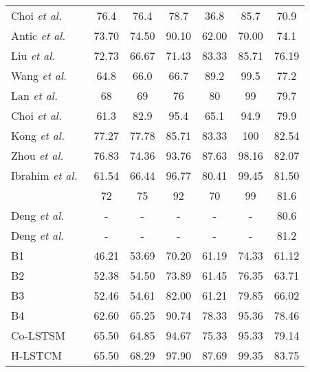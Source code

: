 \documentclass[9pt,journal,letterpaper,twocolumn]{IEEEtran}
\begin{document}
\begin{table}[!t]
{\begin{center}
\begin{tabular}{lc cc ccc}
					\hspace{-0.5em}Choi {\em et al.}~\cite{choi2011learning}& 76.4  & 76.4 & 78.7 & 36.8 & 85.7 & 70.9  \\
					\hspace{-0.5em}Antic {\em et al.}~\cite{antic2014learning} & 73.70 & 74.50 & 90.10 & 62.00 & 70.00 & 74.1 \\
					\hspace{-0.5em}Liu {\em et al.}~\cite{liu2011recognizing}& 72.73  & 66.67  & 71.43  & 83.33 & 85.71 & 76.19  \\
					\hspace{-0.5em}Wang  {\em et al.}~\cite{wang2017a} & 64.8 & 66.0 & 66.7 & 89.2 & 99.5  & 77.2 \\	
					\hspace{-0.5em}Lan {\em et al.}~\cite{lan2012discriminative} & 68 & 69 & 76 & 80  &  99& 79.7  \\				
					\hspace{-0.5em}Choi {\em et al.}~\cite{choi2012unified} &  61.3 & 82.9 & 95.4 & 65.1 & 94.9 & 79.9   \\		
					\hspace{-0.5em}Kong {\em et al.}~\cite{kong2014interactive}  & 77.27  & 77.78 & 85.71 & 83.33 & 100 & 82.54   \\
					\hspace{-0.5em}Zhou {\em et al.}~\cite{zhou2016generative} &  76.83 & 74.36 & 93.76 & 87.63 & 98.16 & 82.07   \\			    
					\hspace{-0.5em}Ibrahim {\em et al.}~\cite{ibrahim2015hierarchical} & 61.54 & 66.44  & 96.77 & 80.41 & 99.45 & 81.50   \\
					\hspace{-0.5em}{\scriptsize \scriptsize Hajimirsadeghi {\em et al.}}~\cite{hajimirsadeghi2016multi-instance}  & 72 & 75   & 92 & 70 & 99 & 81.6 \\		
					\hspace{-0.5em}Deng {\em et al.}~\cite{deng2015deep}  &  - & - & - & - & - & 80.6   \\
					\hspace{-0.5em}Deng {\em et al.}~\cite{deng2016structure} &  - & - & - & - & - & 81.2  \\
					
					\hline
					B1   & 46.21 &	53.69 &	70.20&	61.19&	74.33&	61.12
					\\
					B2  & 52.38	& 54.50&	73.89&	61.45&	76.35&	63.71
					\\
					B3 & 52.46&	54.61&	82.00&	61.21&	79.85&	66.02
					\\
					B4 & 62.60& 	65.25& 	90.74& 	78.33& 	95.36& 	78.46
					\\
					{Co-LSTSM}  & 65.50&	64.85&	94.67&	75.33&	95.33&
					79.14
					\\
					{H-LSTCM} & 65.50&	68.29&	97.90&	87.69&	99.35&	83.75
					\\
					\hline
				\end{tabular}
			\end{center}
		}
		\vspace{-3mm}
		\label{CAD_results}	
	\end{table}
\end{document}
